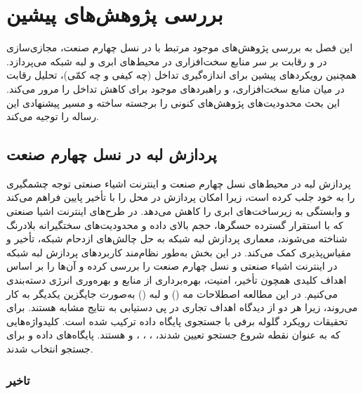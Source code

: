 
\chapter{بررسی پژوهش‌های پیشین}\label{chap:litr}

این فصل به بررسی پژوهش‌های موجود مرتبط با  در نسل چهارم صنعت، مجازی‌سازی در  و رقابت بر سر منابع سخت‌افزاری در محیط‌های ابری و لبه‌ شبکه می‌پردازد. همچنین رویکردهای پیشین برای اندازه‌گیری تداخل (چه کیفی و چه کمّی)، تحلیل رقابت در میان منابع سخت‌افزاری، و راهبردهای موجود برای کاهش تداخل را مرور می‌کند. این بحث محدودیت‌های پژوهش‌های کنونی را برجسته ساخته و مسیر پیشنهادی این رساله را توجیه می‌کند.

\section{پردازش لبه در نسل چهارم صنعت}

پردازش لبه در محیط‌های نسل چهارم صنعت و اینترنت اشیاء صنعتی توجه چشمگیری را به خود جلب کرده است، زیرا امکان پردازش در محل را با تأخیر پایین فراهم می‌کند و وابستگی به زیرساخت‌های ابری را کاهش می‌دهد. در طرح‌های اینترنت اشیا صنعتی که با استقرار گسترده حسگرها، حجم بالای داده و محدودیت‌های سختگیرانه بلادرنگ شناخته می‌شوند، معماری پردازش لبه شبکه به حل چالش‌های ازدحام شبکه، تأخیر و مقیاس‌پذیری کمک می‌کند. در این بخش به‌طور نظام‌مند کاربردهای پردازش لبه شبکه در اینترنت اشیاء صنعتی  و نسل چهارم صنعت را بررسی کرده و آن‌ها را بر اساس اهداف کلیدی همچون تأخیر، امنیت، بهره‌برداری از منابع و بهره‌وری انرژی دسته‌بندی می‌کنیم. در این مطالعه اصطلاحات مه () و لبه () به‌صورت جایگزین یکدیگر به کار می‌روند، زیرا هر دو از دیدگاه اهداف تجاری در پی دستیابی به نتایج مشابه هستند. برای تحقیقات رویکرد گلوله برفی با جستجوی پایگاه داده ترکیب شده است. کلیدواژه‌هایی که به عنوان نقطه شروع جستجو تعیین شدند، ، ، ،  و  هستند. پایگاه‌های داده  و  برای جستجو انتخاب شدند.

\subsection{تاخیر}

